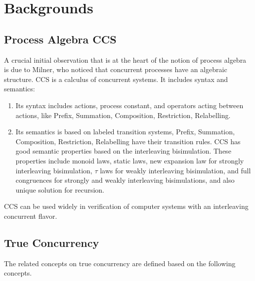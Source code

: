 \section{Backgrounds}\label{bac}

\subsection{Process Algebra CCS}

A crucial initial observation that is at the heart of the notion of process algebra is due to Milner, who noticed that concurrent processes have an algebraic structure. CCS \cite{CC} \cite{CCS} is a calculus of concurrent systems. It includes syntax and semantics:

\begin{enumerate}
  \item Its syntax includes actions, process constant, and operators acting between actions, like Prefix, Summation, Composition, Restriction, Relabelling.
  \item Its semantics is based on labeled transition systems, Prefix, Summation, Composition, Restriction, Relabelling have their transition rules. CCS has good semantic properties based on the interleaving bisimulation. These properties include monoid laws, static laws, new expansion law for strongly interleaving bisimulation, $\tau$ laws for weakly interleaving bisimulation, and full congruences for strongly and weakly interleaving bisimulations, and also unique solution for recursion.
\end{enumerate}

CCS can be used widely in verification of computer systems with an interleaving concurrent flavor.

\subsection{True Concurrency}

The related concepts on true concurrency are defined based on the following concepts.


